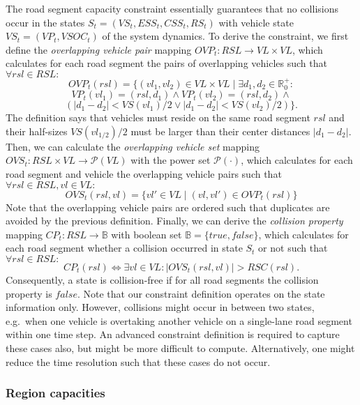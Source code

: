 The road segment capacity constraint essentially guarantees that no collisions occur in the states $S_t = (VS_t, ESS_t, CSS_t, RS_t)$ with vehicle state $VS_t = (VP_t, VSOC_t)$ of the system dynamics. To derive the constraint, we first define the \textit{overlapping vehicle pair} mapping $OVP_t : RSL \rightarrow VL \times VL$, which calculates for each road segment the pairs of overlapping vehicles such that $\forall rsl \in RSL:$
\[
	OVP_t(rsl) = \{(vl_1, vl_2) \in VL \times VL \mid \exists d_1, d_2 \in \mathbb{R}_0^+:
\]
\[
	VP_t(vl_1) = (rsl, d_1) \wedge VP_t(vl_2) = (rsl, d_2) \wedge
\]
\[
	(|d_1 - d_2| < VS(vl_1) / 2 \vee |d_1 - d_2| < VS(vl_2) / 2) \} \textrm{.}
\]
The definition says that vehicles must reside on the same road segment $rsl$ and their half-sizes $VS(vl_{1/2}) / 2$ must be larger than their center distances $|d_1 - d_2|$. Then, we can calculate the \textit{overlapping vehicle set} mapping $OVS_t : RSL \times VL \rightarrow \mathcal{P}(VL)$ with the power set $\mathcal{P}(\cdot)$, which calculates for each road segment and vehicle the overlapping vehicle pairs such that $\forall rsl \in RSL, vl \in VL:$
\[
	OVS_t(rsl,vl) = \{vl' \in VL \mid (vl, vl') \in OVP_t(rsl)\}
\]
Note that the overlapping vehicle pairs are ordered such that duplicates are avoided by the previous definition. Finally, we can derive the \textit{collision property} mapping $CP_t : RSL \rightarrow \mathbb{B}$ with boolean set $\mathbb{B} = \{true, false\}$, which calculates for each road segment whether a collision occurred in state $S_t$ or not such that $\forall rsl \in RSL:$
\[
	CP_t(rsl) \Leftrightarrow \exists vl \in VL : |OVS_t(rsl, vl)| > RSC(rsl) \textrm{.}
\]
Consequently, a state is collision-free if for all road segments the collision property is $false$. Note that our constraint definition operates on the state information only. However, collisions might occur in between two states, e.g.\ when one vehicle is overtaking another vehicle on a single-lane road segment within one time step. An advanced constraint definition is required to capture these cases also, but might be more difficult to compute. Alternatively, one might reduce the time resolution such that these cases do not occur.

\subsubsection{Region capacities}
\label{capacities}

